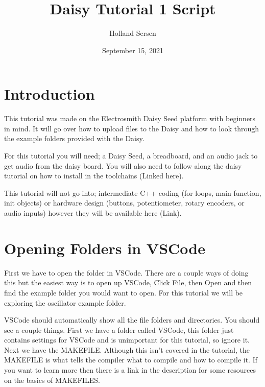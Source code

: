 \documentclass[12pt]{article}
\begin{document}
\title{Daisy Tutorial 1 Script}
\author{Holland Sersen}
\date{September 15, 2021}
\maketitle

\newpage
\tableofcontents


\pagebreak
\section{Introduction}

This tutorial was made on the Electrosmith Daisy Seed platform with beginners in mind. It will go over how to upload files to the Daisy and how to look through the example folders provided with the Daisy.

For this tutorial you will need; a Daisy Seed, a breadboard, and an audio jack to get audio from the daisy board. You will also need to follow along the daisy tutorial on how to install in the toolchains (Linked here).\

This tutorial will not go into; intermediate C++ coding (for loops, main function, init objects) or hardware design (buttons, potentiometer, rotary encoders, or audio inputs) however they will be available here (Link).

\section{Opening Folders in VSCode}

First we have to open the folder in VSCode. There are a couple ways of doing this but the easiest way is to open up VSCode, Click File, then Open and then find the example folder you would want to open. For this tutorial we will be exploring the oscillator example folder.

VSCode should automatically show all the file folders and directories. You should see a couple things. First we have a folder called VSCode, this folder just contains settings for VSCode and is unimportant for this tutorial, so ignore it. Next we have the MAKEFILE. Although this isn’t covered in the tutorial, the MAKEFILE is what tells the compiler what to compile and how to compile it. If you want to learn more then there is a link in the description for some resources on the basics of MAKEFILES.
\end{document}

